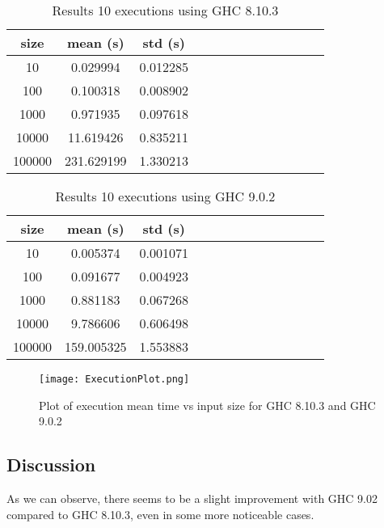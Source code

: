 \begin{table}[H]
    \begin{adjustwidth}{-1in}{-1in} %
    \centering
    \begin{tabular}{|c|c|c|c|c|c|c|c|c|c|c|c|c|}
    \hline
    size & mean (s)& std (s) \\
    \hline
    10 & 0.029994 & 0.012285 \\
    100 & 0.100318 & 0.008902 \\
    1000 & 0.971935 & 0.097618 \\
    10000 & 11.619426 & 0.835211 \\
    100000 & 231.629199 & 1.330213 \\
    \hline
    \end{tabular}
    \caption[{[Exp] Table results GHC 8.10.3}]{Results 10 executions using GHC 8.10.3}
    \label{results1}
    \end{adjustwidth}
\end{table}

\begin{table}[H]
    \begin{adjustwidth}{-1in}{-1in} %
    \centering
    \begin{tabular}{|c|c|c|c|c|c|c|c|c|c|c|c|c|}
    \hline
    size & mean (s)& std (s) \\
    \hline
    10 & 0.005374 & 0.001071 \\
    100 & 0.091677 & 0.004923 \\
    1000 & 0.881183 & 0.067268 \\
    10000 & 9.786606 & 0.606498 \\
    100000 & 159.005325 & 1.553883 \\
    \hline
    \end{tabular}
    \caption[{[Exp] Table results GHC 9.0.2}]{Results 10 executions using GHC 9.0.2}
    \label{results2}
    \end{adjustwidth}
\end{table}

\begin{figure}[H]
    \centering
    \texttt{[image: ExecutionPlot.png]}
    \caption[{[Exp] Plot GHC 8.10.3 vs 9.0.2}]{Plot of execution mean time vs input size for GHC 8.10.3 and GHC 9.0.2}
    \label{fig:results3}
\end{figure}

\subsection*{Discussion}
As we can observe, there seems to be a slight improvement with GHC 9.02 compared to GHC 8.10.3, even in some more noticeable cases. \\

